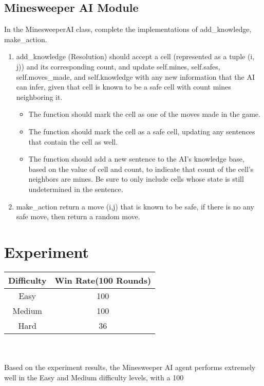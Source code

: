 \documentclass{article} %
\begin{document}
\subsection*{Minesweeper AI Module}
In the MinesweeperAI class, complete the implementations of add\_knowledge, make\_action.
\begin{enumerate}
    \item add\_knowledge (Resolution) should accept a cell (represented as a tuple (i, j)) and its corresponding count, and update self.mines, self.safes, self.moves\_made, and self.knowledge with any new information that the AI can infer, given that cell is known to be a safe cell with count mines neighboring it.
    \begin{itemize}
        \item The function should mark the cell as one of the moves made in the game.
        \item The function should mark the cell as a safe cell, updating any sentences that contain the cell as well.
        \item The function should add a new sentence to the AI's knowledge base, based on the value of cell and count, to indicate that count of the cell's neighbors are mines. Be sure to only include cells whose state is still undetermined in the sentence.
    \end{itemize}
    \item make\_action return a move (i,j) that is known to be safe, if there is no any safe move, then return a random move.
\end{enumerate}

\section{Experiment}

\begin{tabular}{@{}cc@{}}
\toprule
\textbf{Difficulty} & \textbf{Win Rate(100 Rounds)} \\ \midrule
Easy   & 100  \\
Medium & 100   \\
Hard   & 36   \\ \bottomrule
\end{tabular}%
\\
\\

Based on the experiment results, the Minesweeper AI agent performs extremely well in the Easy and Medium difficulty levels, with a 100%
\end{document}

